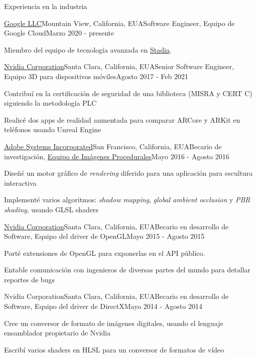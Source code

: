 \documentclass{resume} %
\begin{document}

\begin{rSection}{Experiencia en la industria}

\begin{rSubsection}{\href{http://about.google/}{Google LLC}}{Mountain View, California, EUA}{Software Engineer, Equipo de Google Cloud}{Marzo 2020 - presente}
\item Miembro del equipo de tecnología avanzada en \href{http://stadia.google.com/}{Stadia}.
\end{rSubsection}

\begin{rSubsection}{\href{http://www.nvidia.com}{Nvidia Corporation}}{Santa Clara, California, EUA}{Senior Software Engineer, Equipo 3D para dispositivos móviles}{Agosto 2017 - Feb 2021}
\item Contribuí en la certificación de seguridad de una biblioteca (MISRA y CERT C) siguiendo la metodología PLC
\item Realicé dos apps de realidad aumentada para comparar ARCore y ARKit en teléfonos usando Unreal Engine
\end{rSubsection}

\begin{rSubsection}{\href{http://www.adobe.com/}{Adobe Systems Incorporated}}{San Francisco, California, EUA}{Becario de investigación, \href{http://research.adobe.com/}{Equipo de Imágenes Procedurales}}{Mayo 2016 - Agosto 2016}
\item Diseñé un motor gráfico de \emph{rendering} diferido para una aplicación para escultura interactiva
\item Implementé varios algoritmos: \emph{shadow mapping}, \emph{global ambient occlusion} y \emph{PBR shading}, usando GLSL shaders
\end{rSubsection}

\begin{rSubsection}{\href{http://www.nvidia.com}{Nvidia Corporation}}{Santa Clara, California, EUA}{Becario en desarrollo de Software, Equipo del driver de OpenGL}{Mayo 2015 - Agosto 2015}
\item Porté extensiones de OpenGL para exponerlas en el API público.
\item Entable comunicación con ingenieros de diversas partes del mundo para detallar reportes de bugs
\end{rSubsection}

\begin{rSubsection}{Nvidia Corporation}{Santa Clara, California, EUA}{Becario en desarrollo de Software, Equipo del driver de DirectX}{Mayo 2014 - Agosto 2014}
\item Cree un conversor de formato de imágenes digitales, usando el lenguaje ensamblador propietario de Nvidia
\item Escribí varios shaders en HLSL para un conversor de formatos de vídeo
\end{rSubsection}

\end{rSection}
\end{document}
